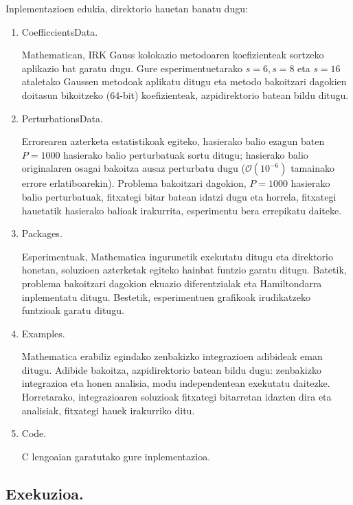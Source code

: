 Inplementazioen edukia, direktorio hauetan banatu dugu:
\begin{enumerate}

\item CoefficcientsData.

Mathematican, IRK Gauss kolokazio metodoaren koefizienteak sortzeko aplikazio bat garatu dugu. Gure esperimentuetarako $s=6,s=8$ eta $s=16$ ataletako Gaussen metodoak aplikatu ditugu eta metodo bakoitzari dagokien doitasun bikoitzeko ($64$-bit) koefizienteak, azpidirektorio batean bildu ditugu.

\item PerturbationsData.

Errorearen azterketa estatistikoak egiteko, hasierako balio ezagun baten $P=1000$ hasierako balio perturbatuak sortu ditugu; hasierako balio originalaren osagai bakoitza ausaz perturbatu dugu ($\mathcal{O}(10^{-6})$ tamainako errore erlatiboarekin). Problema bakoitzari dagokion, $P=1000$ hasierako balio perturbatuak, fitxategi bitar batean idatzi dugu eta horrela, fitxategi hauetatik hasierako balioak  irakurrita, esperimentu bera errepikatu daiteke.

\item Packages.

Esperimentuak, Mathematica ingurunetik exekutatu ditugu eta direktorio honetan, soluzioen azterketak egiteko hainbat funtzio garatu ditugu. Batetik, problema bakoitzari dagokion ekuazio diferentzialak eta Hamiltondarra inplementatu ditugu. Bestetik, esperimentuen grafikoak irudikatzeko funtzioak garatu ditugu. 

\item Examples.

Mathematica erabiliz egindako zenbakizko integrazioen adibideak eman ditugu. Adibide bakoitza, azpidirektorio batean bildu dugu: zenbakizko integrazioa eta honen analisia, modu independentean exekutatu daitezke. Horretarako, integrazioaren soluzioak fitxategi bitarretan idazten dira eta analisiak, fitxategi hauek irakurriko ditu.       

\item Code.

C lengoaian garatutako gure inplementazioa. 

\end{enumerate}

\subsection*{Exekuzioa.}


